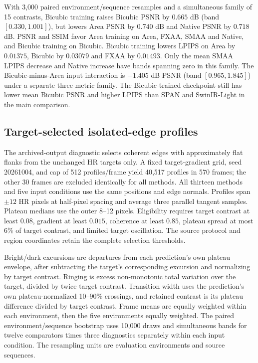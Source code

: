 \documentclass[10pt,twocolumn,letterpaper]{article}
\begin{document}
With 3,000 paired environment/sequence resamples and a simultaneous family of 15 contrasts, Bicubic training raises Bicubic PSNR by $0.665$ dB (band $[0.330,1.001]$), but lowers Area PSNR by $0.740$ dB and Native PSNR by $0.718$ dB.
PSNR and SSIM favor Area training on Area, FXAA, SMAA and Native, and Bicubic training on Bicubic.
Bicubic training lowers LPIPS on Area by $0.01375$, Bicubic by $0.03079$ and FXAA by $0.01493$.
Only the mean SMAA LPIPS decrease and Native increase have bands spanning zero in this family.
The Bicubic-minus-Area input interaction is $+1.405$ dB PSNR (band $[0.965,1.845]$) under a separate three-metric family.
The Bicubic-trained checkpoint still has lower mean Bicubic PSNR and higher LPIPS than SPAN and SwinIR-Light in the main comparison.

\subsection{Target-selected isolated-edge profiles}
\label{sec:isolated-edges}
The archived-output diagnostic selects coherent edges with approximately flat flanks from the unchanged HR targets only.
A fixed target-gradient grid, seed 20261004, and cap of 512 profiles/frame yield 40,517 profiles in 570 frames; the other 30 frames are excluded identically for all methods.
All thirteen methods and five input conditions use the same positions and edge normals.
Profiles span $\pm12$ HR pixels at half-pixel spacing and average three parallel tangent samples.
Plateau medians use the outer 8--12 pixels.
Eligibility requires target contrast at least $0.08$, gradient at least $0.015$, coherence at least $0.85$, plateau spread at most $6\%$ of target contrast, and limited target oscillation.
The source protocol and region coordinates retain the complete selection thresholds.

Bright/dark excursions are departures from each prediction's own plateau envelope, after subtracting the target's corresponding excursion and normalizing by target contrast.
Ringing is excess non-monotonic total variation over the target, divided by twice target contrast.
Transition width uses the prediction's own plateau-normalized 10--90\% crossings, and retained contrast is its plateau difference divided by target contrast.
Frame means are equally weighted within each environment, then the five environments equally weighted.
The paired environment/sequence bootstrap uses 10,000 draws and simultaneous bands for twelve comparators times three diagnostics separately within each input condition.
The resampling units are evaluation environments and source sequences.
\end{document}
